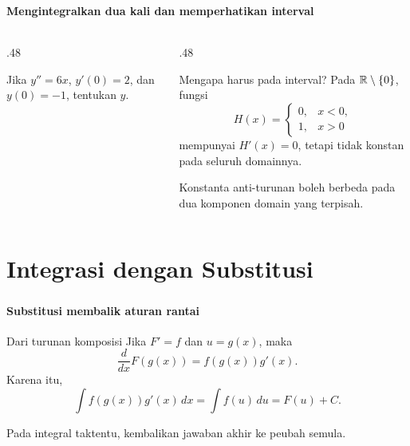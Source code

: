 \documentclass{../../kalkulus-ppt}
\begin{document}
\begin{frame}
\frametitle{\insertsection}
\framesubtitle{Mengintegralkan dua kali dan memperhatikan interval}
\begin{columns}[c]
\begin{column}{.48\textwidth}

\begin{contoh}
Jika $y''=6x$, $y'(0)=2$, dan $y(0)=-1$, tentukan $y$.
\end{contoh}
\end{column}
\begin{column}{.48\textwidth}

\begin{alertblock}{Mengapa harus pada interval?}
Pada $\mathbb{R}\setminus\{0\}$, fungsi
\[H(x)=\begin{cases}0,&x<0,\\1,&x>0\end{cases}\]
mempunyai $H'(x)=0$, tetapi tidak konstan pada seluruh domainnya.
\end{alertblock}
Konstanta anti-turunan boleh berbeda pada dua komponen domain yang terpisah.
\end{column}
\end{columns}
\end{frame}

\section{Integrasi dengan Substitusi}

\begin{frame}
\frametitle{\insertsection}
\framesubtitle{Substitusi membalik aturan rantai}

\begin{block}{Dari turunan komposisi}
Jika $F'=f$ dan $u=g(x)$, maka
\[\frac{d}{dx}F(g(x))=f(g(x))g'(x).\]
Karena itu,
\[\int f(g(x))g'(x)\,dx=\int f(u)\,du=F(u)+C.\]
\end{block}
Pada integral taktentu, kembalikan jawaban akhir ke peubah semula.
\end{frame}
\end{document}
